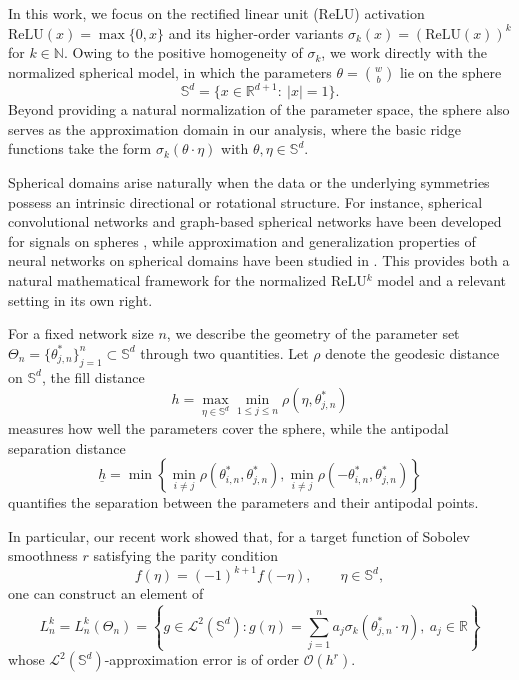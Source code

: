 \documentclass{article}
\numberwithin{equation}{section}
\newcommand{\relu}{\mbox{ReLU}}
\def\RR{\mathbb{R}}
\def\SS{\mathbb{S}}
\begin{document}
In this work, we focus on the rectified linear unit (ReLU) activation $\relu(x)=\max\{0,x\}$ and its higher-order variants $\sigma_k(x)=(\relu(x))^k$ for $k\in\mathbb N$. Owing to the positive homogeneity of $\sigma_k$, we work directly with the normalized spherical model, in which the parameters $\displaystyle\theta=\binom{w}{b}$ lie on the sphere
$$
\SS^d=\{x\in\RR^{d+1}:~|x|=1\}.
$$
Beyond providing a natural normalization of the parameter space, the sphere also serves as the approximation domain in our analysis, where the basic ridge functions take the form $\sigma_k(\theta\cdot\eta)$ with $\theta,\eta\in\SS^d$.

Spherical domains arise naturally when the data or the underlying symmetries possess an intrinsic directional or rotational structure. For instance, spherical convolutional networks and graph-based spherical networks have been developed for signals on spheres \cite{cohen2018spherical,jiang2019spherical,defferrard2019deepsphere}, while approximation and generalization properties of neural networks on spherical domains have been studied in \cite{fang2020theory,feng2023generalization,yang2026spherical}. This provides both a natural mathematical framework for the normalized ReLU$^k$ model and a relevant setting in its own right.


For a fixed network size $n$, we describe the geometry of the parameter set $\Theta_n=\{\theta_{j,n}^*\}_{j=1}^n\subset\mathbb S^d$ through two quantities. Let $\rho$ denote the geodesic distance on $\mathbb S^d$, the fill distance
\[
h=\max_{\eta\in\mathbb S^d}\min_{1\le j\le n}\rho(\eta,\theta_{j,n}^*)
\]
measures how well the parameters cover the sphere, while the antipodal separation distance
\[
\underline h
=
\min\left\{
\min_{i\neq j}\rho(\theta_{i,n}^*,\theta_{j,n}^*),
\min_{i\neq j}\rho(-\theta_{i,n}^*,\theta_{j,n}^*)
\right\}
\]
quantifies the separation between the parameters and their antipodal points. %

In particular, our recent work \cite{liu2025integral} showed that, for a target function of Sobolev smoothness $r$ satisfying the parity condition
\begin{equation}\label{eqn:f_evenodd_relu}
f(\eta)=(-1)^{k+1}f(-\eta),\qquad\eta\in\SS^d,
\end{equation}
one can construct an element of
\begin{equation}\label{shallowk}
L_n^k=L_n^k(\Theta_n)
=
\left\{
g\in\mathcal L^2(\SS^d):
g(\eta)=\sum_{j=1}^n a_j\sigma_k(\theta_{j,n}^*\cdot\eta),
\ a_j\in\mathbb R
\right\}
\end{equation}
whose $\mathcal L^2(\SS^d)$-approximation error is of order $\mathcal O(h^r)$.
\end{document}
